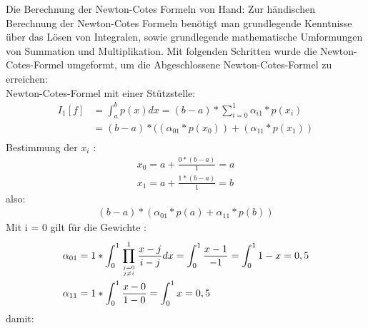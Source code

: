 \documentclass[course=erap]{aspdoc}
\begin{document}
Die Berechnung der Newton-Cotes Formeln von Hand:
Zur händischen Berechnung der Newton-Cotes Formeln benötigt man grundlegende Kenntnisse über das Lösen von Integralen, sowie grundlegende mathematische Umformungen von Summation und Multiplikation.
Mit folgenden Schritten wurde die Newton-Cotes-Formel umgeformt, um die Abgeschlossene Newton-Cotes-Formel zu erreichen:\\
Newton-Cotes-Formel mit einer Stützstelle:
\begin{align*}
 I_1[f] &= \int_{a}^{b} p(x)dx = (b-a) * \sum_{i=0}^{1}\alpha_{i1} * p(x_i) \\
&= (b-a)*((\alpha_{01} * p(x_0))+(\alpha_{11} * p(x_1))\\
\end{align*}
Bestimmung der $x_i$ : 
\begin{align*}
x_0 = a + \frac{0*(b-a)}{1} = a\\
x_1 = a + \frac{1*(b-a)}{1} = b
\end{align*}
also:
\begin{align*}
(b-a)*(\alpha_{01}*p(a) + \alpha_{11}* p(b))
\end{align*}
Mit i = 0 gilt für die Gewichte :
\begin{align*}
\alpha_{01} &= 1*\int_{0}^{1}\prod_{j= 0\atop j \neq i}^{1} \frac{x-j}{i-j}dx = \int_{0}^{1} \frac{x-1}{-1} = \int_{0}^{1} 1-x = 0,5 \\
\alpha_{11} &= 1*\int_{0}^{1}\frac{x-0}{1-0} = \int_{0}^{1}x = 0,5
\end{align*}
damit:
\end{document}
